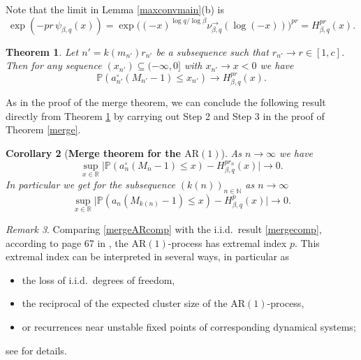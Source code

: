 \documentclass[12pt]{amsart}
\newtheorem{theorem}{Theorem}[section]
\newtheorem{corollary}[theorem]{Corollary}
\theoremstyle{definition}
\theoremstyle{remark}
\newtheorem{remark}[theorem]{Remark}
\newcommand{\rr}{{\mathbb R}}
\newcommand{\nat}{{\mathbb N}}
\newcommand{\AR}{\operatorname{AR(1)}}
\newcommand{\Pm}{{\mathbb P}}
\numberwithin{equation}{section}
\begin{document}
Note that the limit in Lemma \ref{maxconvmain}(b) is
\begin{equation}\label{limitH}
\exp(-pr\,\psi_{\beta,q}(x))=\exp\big((-x)^{\log q/\log\beta}\nu_{\beta,q}^{\to}(\log(-x))\big)^{pr}=H_{\beta,q}^{pr}(x).
\end{equation}

\begin{theorem}\label{mergeAR1sub}
Let $n'=k(m_{n'})r_{n'}$ be a subsequence such that $r_{n'}\to r\in[1,c]$. Then for  any sequence $(x_{n'})\subseteq(-\infty,0]$ with $x_{n'}\to x<0$ we have
$$\Pm(a_{n'}^{\circ}(M_{n'}-1)\leq x_{n'})\to H_{\beta,q}^{pr}(x).$$
\end{theorem}

As in the proof of the merge theorem, we can conclude the following result directly from Theorem \ref{mergeAR1sub} by carrying out Step 2 and Step 3 in the proof of Theorem \ref{merge}.

\begin{corollary}[\bf Merge theorem for the $\AR$]\label{mergeAR1}
As $n\to\infty$ we have
\begin{equation}\label{mergeARcomp}
\sup_{x\in\rr}\big|\Pm(a_{n}^{\circ}(M_{n}-1)\leq x)-H_{\beta,q}^{pr_{n}}(x)\big|\to0.
\end{equation}
In particular we get for the subsequence $(k(n))_{n\in\nat}$ as $n\to\infty$
$$\sup_{x\in\rr}\big|\Pm(a_{n}(M_{k(n)}-1)\leq x)-H_{\beta,q}^{p}(x)\big|\to0.$$
\end{corollary}

\begin{remark}
Comparing \eqref{mergeARcomp} with the i.i.d.\ result \eqref{mergecomp}, according to page 67 in \cite{LLR}, the $\AR$-process has extremal index $p$. This extremal index can be interpreted in several ways, in particular as
\begin{itemize}
\item the loss of i.i.d.\ degrees of freedom,
\item the reciprocal of the expected cluster size of the $\AR$-process,
\item or recurrences near unstable fixed points of corresponding dynamical systems;
\end{itemize}
see \cite{MFS} for details.
\end{remark}
\end{document}
